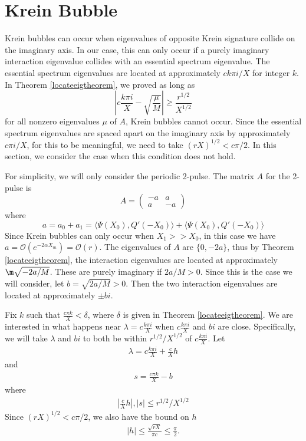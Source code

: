 \documentclass[thesis.tex]{subfiles}
\begin{document}
\chapter{Krein Bubble}

Krein bubbles can occur when eigenvalues of opposite Krein signature collide on the imaginary axis. In our case, this can only occur if a purely imaginary interaction eigenvalue collides with an essential spectrum eigenvalue. The essential spectrum eigenvalues are located at approximately $c k \pi i / X$ for integer $k$. In Theorem \ref{locateeigtheorem}, we proved as long as 
\[
\left| c \frac{k \pi i}X - \sqrt{\frac{\mu}{M}} \right| \geq \frac{r^{1/2}}{X^{1/2}}
\]
for all nonzero eigenvalues $\mu$ of $A$, Krein bubbles cannot occur. Since the essential spectrum eigenvalues are spaced apart on the imaginary axis by approximately $c \pi i / X$, for this to be meaningful, we need to take $(r X)^{1/2} < c \pi/2$. In this section, we consider the case when this condition does not hold.

For simplicity, we will only consider the periodic 2-pulse. The matrix $A$ for the 2-pulse is
\[
A = \begin{pmatrix}
-a & a \\
a & -a
\end{pmatrix}
\]
where
\[
a = a_0 + a_1 = \langle \Psi(X_0), Q'(-X_0) \rangle + \langle \Psi(X_0), Q'(-X_0) \rangle
\]
Since Krein bubbles can only occur when $X_1 >> X_0$, in this case we have $a = \mathcal{O}(e^{-2\alpha X_m}) = \mathcal{O}(r)$. The eigenvalues of $A$ are $\{0, -2a\}$, thus by Theorem \ref{locateeigtheorem}, the interaction eigenvalues are located at approximately $\m \sqrt{-2a/M}$. These are purely imaginary if $2a/M > 0$. Since this is the case we will consider, let $b = \sqrt{2a/M} > 0$. Then the two interaction eigenvalues are located at approximately $\pm b i$.

Fix $k$ such that $\frac{c \pi k}{X} < \delta$, where $\delta$ is given in Theorem \ref{locateeigtheorem}. We are interested in what happens near $\lambda = c \frac{k \pi i}{X}$ when $c \frac{k \pi i}{X}$ and $bi$ are close. Specifically, we will take $\lambda$ and $bi$ to both be within $r^{1/2}/X^{1/2}$ of $c \frac{k \pi i}{X}$. Let
\begin{align}\label{lambdah1}
\lambda = c \frac{k \pi i}{X} + \frac{c}{X}h
\end{align}
and
\begin{align}\label{lambdas1}
s = \frac{c \pi k}{X} - b
\end{align}
where
\begin{align}\label{hsbounds}
\left| \frac{c}{X}h \right|, |s| \leq r^{1/2}/X^{1/2}
\end{align}
Since $(r X)^{1/2} < c \pi/2$, we also have the bound on $h$
\begin{align}\label{hbound1}
|h| \leq \frac{\sqrt{r X}}{\pi c} \leq \frac{\pi}{2}.
\end{align}
\end{document}
